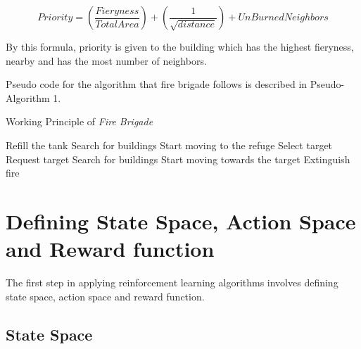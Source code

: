 \documentclass[12pt]{report}
\begin{document}
\[ Priority = (\frac{Fieryness}{Total Area}) + (\frac{1}{\sqrt{distance}}) + {UnBurnedNeighbors}  \]

By this formula, priority is given to the building which has the highest fieryness, nearby and has the most number of neighbors.

Pseudo code for the algorithm that fire brigade follows is described in Pseudo-Algorithm 1.

\begin{algorithm}
\caption{Working Principle of \emph{Fire Brigade}}
\begin{algorithmic}

\STATE  Refill the tank
\ENDIF 
{}
\STATE Search for buildings
\ENDIF
{}
\STATE Start moving to the refuge
\ENDIF
{}
\STATE Select target
\STATE Request target
\ELSE 
\STATE  Search for buildings 
\ENDIF 
\ENDIF
{}
\STATE Start moving towards the target
\ENDIF
{}
\STATE Extinguish fire
\ENDIF
\end{algorithmic}
\end{algorithm}




\section{Defining State Space, Action Space and Reward function}

The first step in applying reinforcement learning algorithms involves defining state space, action space and reward function. 

\subsection{State Space}
    
\end{document}
